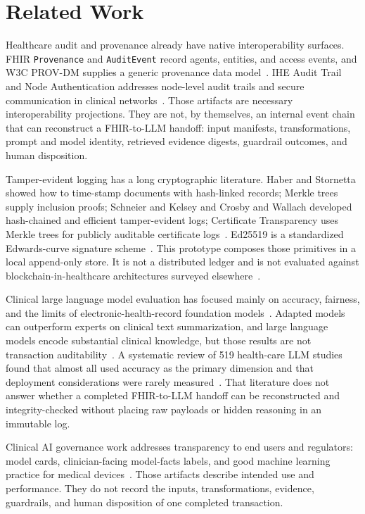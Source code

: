 \documentclass[journal]{IEEEtran}
\begin{document}
\section{Related Work}
\label{sec:related}

Healthcare audit and provenance already have native interoperability
surfaces. FHIR \texttt{Provenance} and \texttt{AuditEvent} record agents,
entities, and access events, and W3C PROV-DM supplies a generic provenance
data model~\cite{hl7provenance,hl7auditevent,provdm}. IHE Audit Trail and Node
Authentication addresses node-level audit trails and secure communication in
clinical networks~\cite{ihe-atna}. Those artifacts are necessary
interoperability projections. They are not, by themselves, an internal
event chain that can reconstruct a FHIR-to-LLM handoff: input manifests,
transformations, prompt and model identity, retrieved evidence digests,
guardrail outcomes, and human disposition.

Tamper-evident logging has a long cryptographic literature. Haber and
Stornetta showed how to time-stamp documents with hash-linked records;
Merkle trees supply inclusion proofs; Schneier and Kelsey and Crosby and
Wallach developed hash-chained and efficient tamper-evident logs; Certificate
Transparency uses Merkle trees for publicly auditable certificate
logs~\cite{haber1991timestamp,merkle1988signature,schneier1998logs,crosby2009tamper,rfc6962}.
Ed25519 is a standardized Edwards-curve signature scheme~\cite{rfc8032}.
This prototype composes those primitives in a local append-only store. It is
not a distributed ledger and is not evaluated against blockchain-in-healthcare
architectures surveyed elsewhere~\cite{agbo2019blockchain}.

Clinical large language model evaluation has focused mainly on accuracy,
fairness, and the limits of electronic-health-record foundation
models~\cite{wornow2023shaky,bedi2025testing}. Adapted models can outperform
experts on clinical text summarization, and large language models encode
substantial clinical knowledge, but those results are not transaction
auditability~\cite{vanveen2024adapted,singhal2023medpalm}. A systematic review
of 519 health-care LLM studies found that almost all used accuracy as the
primary dimension and that deployment considerations were rarely
measured~\cite{bedi2025testing}. That literature does not answer whether a
completed FHIR-to-LLM handoff can be reconstructed and integrity-checked
without placing raw payloads or hidden reasoning in an immutable log.

Clinical AI governance work addresses transparency to end users and
regulators: model cards, clinician-facing model-facts labels, and good machine
learning practice for medical devices~\cite{mitchell2019modelcards,sendak2020modelfacts,fda2021gmlp}.
Those artifacts describe intended use and performance. They do not record the
inputs, transformations, evidence, guardrails, and human disposition of one
completed transaction.
\end{document}
